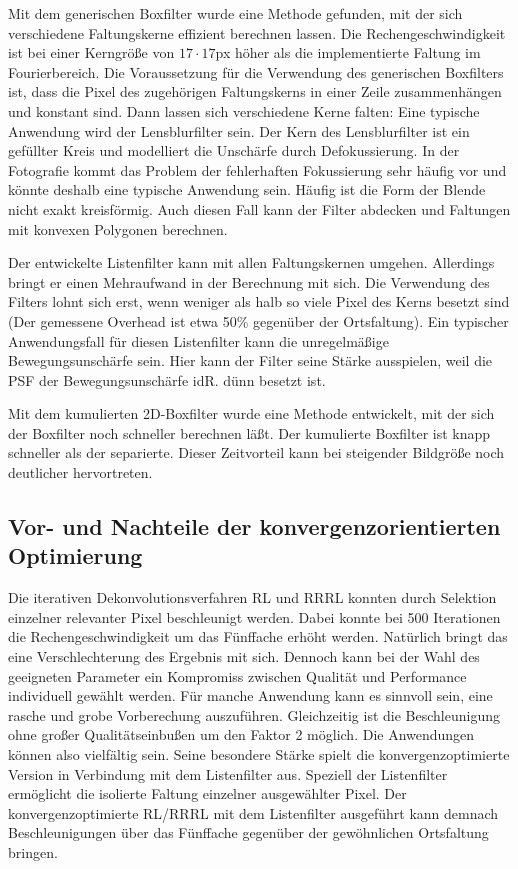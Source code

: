 \documentclass[a4paper,12pt]{article}
\begin{document}
Mit dem generischen Boxfilter wurde eine Methode gefunden, mit der sich
verschiedene Faltungskerne effizient berechnen lassen. Die Rechengeschwindigkeit
ist bei einer Kerngröße von $17 \cdot 17$px höher als die implementierte
Faltung im Fourierbereich. Die Voraussetzung für die
Verwendung des generischen Boxfilters ist, dass die Pixel des zugehörigen
Faltungskerns in einer Zeile zusammenhängen und konstant sind. Dann lassen sich
verschiedene Kerne falten: Eine typische Anwendung wird der Lensblurfilter sein. Der Kern
des Lensblurfilter ist ein gefüllter Kreis und modelliert die Unschärfe durch
Defokussierung. In der Fotografie kommt das Problem der fehlerhaften
Fokussierung sehr häufig vor und könnte deshalb eine typische Anwendung sein.
Häufig ist die Form der Blende nicht exakt kreisförmig. Auch diesen Fall kann
der Filter abdecken und Faltungen mit konvexen Polygonen berechnen.

Der entwickelte Listenfilter kann mit allen Faltungskernen umgehen. Allerdings
bringt er einen Mehraufwand in der Berechnung mit sich. Die Verwendung des
Filters lohnt sich erst, wenn weniger als halb so viele Pixel des Kerns besetzt
sind (Der gemessene Overhead ist etwa 50\% gegenüber der Ortsfaltung). Ein
typischer Anwendungsfall für diesen Listenfilter kann die unregelmäßige
Bewegungsunschärfe sein. Hier kann der Filter seine Stärke ausspielen, weil die
PSF der Bewegungsunschärfe idR. dünn besetzt ist.

Mit dem kumulierten 2D-Boxfilter wurde eine Methode entwickelt, mit der sich der
Boxfilter noch schneller berechnen läßt. Der kumulierte Boxfilter ist knapp
schneller als der separierte. Dieser Zeitvorteil kann bei steigender Bildgröße
noch deutlicher hervortreten. 



\subsection{Vor- und Nachteile der konvergenzorientierten Optimierung}
Die iterativen Dekonvolutionsverfahren RL und RRRL konnten durch Selektion
einzelner relevanter Pixel beschleunigt werden. Dabei konnte bei 500 Iterationen
die Rechen\-geschwindigkeit um das Fünffache erhöht werden. Natürlich bringt das
eine Verschlechterung des Ergebnis mit sich. Dennoch kann bei der Wahl des
geeigneten Parameter ein Kompromiss zwischen Qualität und Performance
individuell gewählt werden. Für manche Anwendung kann es sinnvoll sein, eine
rasche und grobe Vorberechung auszuführen. Gleichzeitig ist die Beschleunigung
ohne großer Qualitätseinbußen um den Faktor 2 möglich. Die Anwendungen können also
vielfältig sein. Seine besondere Stärke spielt die konvergenzoptimierte Version
 in Verbindung mit dem Listenfilter aus. Speziell der
Listenfilter ermöglicht die isolierte Faltung einzelner ausgewählter Pixel. Der
konvergenzoptimierte RL/RRRL mit dem Listenfilter ausgeführt kann demnach
Beschleunigungen über das Fünffache gegenüber der gewöhnlichen
Ortsfaltung bringen.
 
\end{document}
